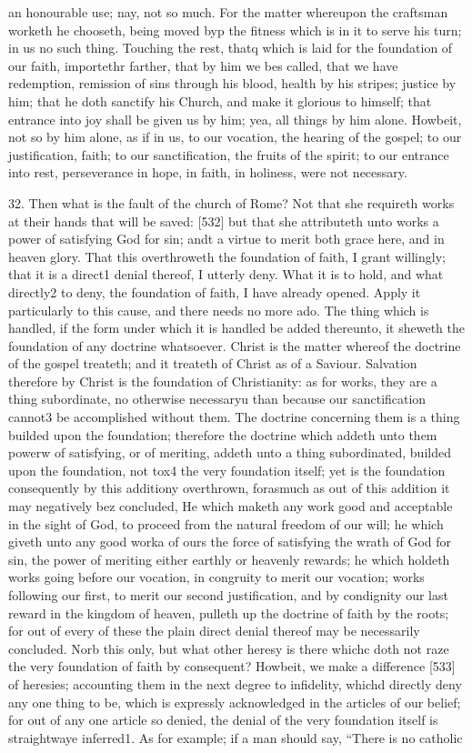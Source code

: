 an honourable use; nay, not so much. For the matter whereupon the craftsman worketh he chooseth, being moved byp the fitness which is in it to serve his turn; in us no such thing. Touching the rest, thatq which is laid for the foundation of our faith, importethr farther, that by him we bes called, that we have redemption, remission of sins through his blood, health by his stripes; justice by him; that he doth sanctify his Church, and make it glorious to himself; that entrance into joy shall be given us by him; yea, all things by him alone. Howbeit, not so by him alone, as if in us, to our vocation, the hearing of the gospel; to our justification, faith; to our sanctification, the fruits of the spirit; to our entrance into rest, perseverance in hope, in faith, in holiness, were not necessary.

32. Then what is the fault of the church of Rome? Not that she requireth works at their hands that will be saved: [532] but that she attributeth unto works a power of satisfying God for sin; andt a virtue to merit both grace here, and in heaven glory. That this overthroweth the foundation of faith, I grant willingly; that it is a direct1 denial thereof, I utterly deny. What it is to hold, and what directly2 to deny, the foundation of faith, I have already opened. Apply it particularly to this cause, and there needs no more ado. The thing which is handled, if the form under which it is handled be added thereunto, it sheweth the foundation of any doctrine whatsoever. Christ is the matter whereof the doctrine of the gospel treateth; and it treateth of Christ as of a Saviour. Salvation therefore by Christ is the foundation of Christianity: as for works, they are a thing subordinate, no otherwise necessaryu than because our sanctification cannot3 be accomplished without them. The doctrine concerning them is a thing builded upon the foundation; therefore the doctrine which addeth unto them powerw of satisfying, or of meriting, addeth unto a thing subordinated, builded upon the foundation, not tox4 the very foundation itself; yet is the foundation consequently by this additiony overthrown, forasmuch as out of this addition it may negatively bez concluded, He which maketh any work good and acceptable in the sight of God, to proceed from the natural freedom of our will; he which giveth unto any good worka of ours the force of satisfying the wrath of God for sin, the power of meriting either earthly or heavenly rewards; he which holdeth works going before our vocation, in congruity to merit our vocation; works following our first, to merit our second justification, and by condignity our last reward in the kingdom of heaven, pulleth up the doctrine of faith by the roots; for out of every of these the plain direct denial thereof may be necessarily concluded. Norb this only, but what other heresy is there whichc doth not raze the very foundation of faith by consequent? Howbeit, we make a difference [533] of heresies; accounting them in the next degree to infidelity, whichd directly deny any one thing to be, which is expressly acknowledged in the articles of our belief; for out of any one article so denied, the denial of the very foundation itself is straightwaye inferred1. As for example; if a man should say, “There is no catholic 